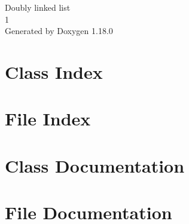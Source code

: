 \documentclass[twoside]{book}
\newcommand{\+}{\discretionary{\mbox{\scriptsize$\hookleftarrow$}}{}{}}
\newcommand{\clearemptydoublepage}{%
    \newpage{\pagestyle{empty}\cleardoublepage}%
  }
\begin{document}
  \raggedbottom
    \hypersetup{pageanchor=false,
                bookmarksnumbered=true,
                pdfencoding=unicode
               }
  \begin{titlepage}
  \vspace*{7cm}
  \begin{center}%
  {\Large Doubly linked list}\\
  [1ex]\large 1 \\
  \vspace*{1cm}
  {\large Generated by Doxygen 1.18.0}\\
  \end{center}
  \end{titlepage}
  \clearemptydoublepage
  \tableofcontents
  \clearemptydoublepage
  \hypersetup{pageanchor=true}

\chapter{Class Index}

\chapter{File Index}

\chapter{Class Documentation}



\chapter{File Documentation}







  \backmatter
  \newpage
  \clearemptydoublepage
  \printindex
\end{document}
